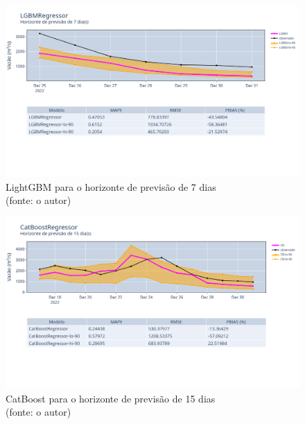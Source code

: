 \begin{figure}[!h]
	\centering
	\includegraphics[scale=0.33]{Figuras/jequiti/resultados/LGBMRegressor_fh7.png}
	\caption{LightGBM para o horizonte de previsão de 7 dias\\(fonte: o autor)}
	\label{fig:jequiti_LGBMRegressor_fh7}
\end{figure}

\begin{figure}[!h]
	\centering
	\includegraphics[scale=0.33]{Figuras/jequiti/resultados/CatBoostRegressor_fh15.png}
	\caption{CatBoost para o horizonte de previsão de 15 dias\\(fonte: o autor)}
	\label{fig:jequiti_CatBoostRegressor_fh15}
\end{figure}

